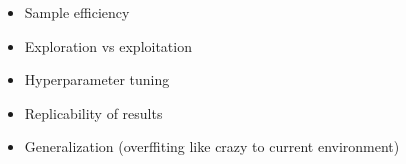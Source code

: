\documentclass{../main.tex}{subfiles}
\begin{document}
\begin{itemize}
\item Sample efficiency
\item Exploration vs exploitation
\item Hyperparameter tuning
\item Replicability of results
\item Generalization (overffiting like crazy to current environment)
\end{itemize}
\end{document}
